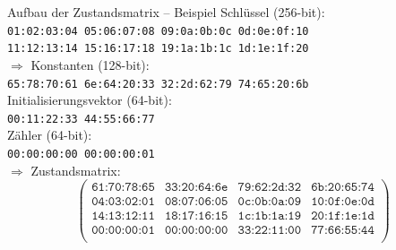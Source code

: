 \documentclass{beamer}
\begin{document}
\begin{frame}{Aufbau der Zustandsmatrix -- Beispiel}
Schlüssel (256-bit): \\
\hspace{1em} \texttt{01:02:03:04 05:06:07:08 09:0a:0b:0c 0d:0e:0f:10} \\
\hspace{1em} \texttt{11:12:13:14 15:16:17:18 19:1a:1b:1c 1d:1e:1f:20} \\
$\Rightarrow$ Konstanten (128-bit): \\
\hspace{1em} \texttt{65:78:70:61 6e:64:20:33 32:2d:62:79 74:65:20:6b} \\
Initialisierungsvektor (64-bit): \\
\hspace{1em} \texttt{00:11:22:33 44:55:66:77} \\
Zähler (64-bit): \\
\hspace{1em} \texttt{00:00:00:00 00:00:00:01} \\
\vspace{1em} $\Rightarrow$ Zustandsmatrix:
\begin{equation*}
\begin{pmatrix}
\texttt{61:70:78:65}& \texttt{33:20:64:6e} & \texttt{79:62:2d:32} & \texttt{6b:20:65:74} \\
\texttt{04:03:02:01} & \texttt{08:07:06:05} & \texttt{0c:0b:0a:09} & \texttt{10:0f:0e:0d} \\
\texttt{14:13:12:11} & \texttt{18:17:16:15} & \texttt{1c:1b:1a:19} & \texttt{20:1f:1e:1d} \\
\texttt{00:00:00:01} & \texttt{00:00:00:00} & \texttt{33:22:11:00} & \texttt{77:66:55:44} \\
\end{pmatrix}
\end{equation*}
\end{frame}
\end{document}
